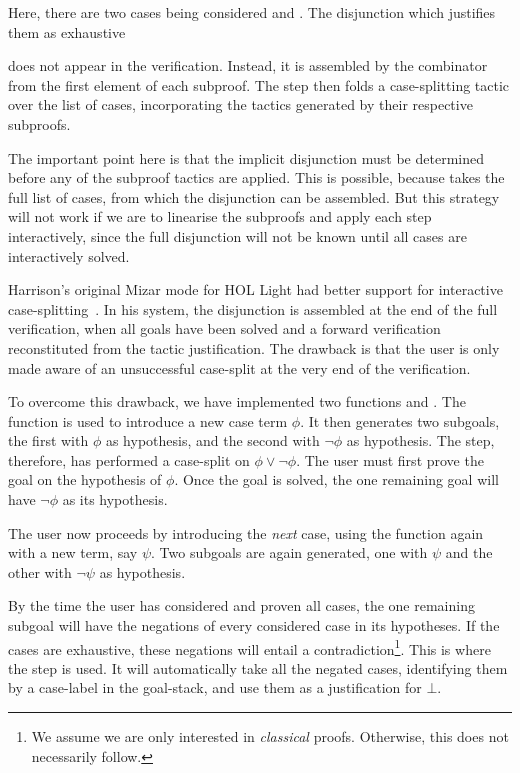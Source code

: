 {\samepage Here, there are two cases being considered  and . The disjunction which justifies them as exhaustive
\begin{center}\end{center}}

\noindent does not appear in the verification. Instead, it is assembled by the  combinator from the first element of each subproof. The step then folds a case-splitting tactic over the list of cases, incorporating the tactics generated by their respective subproofs.

The important point here is that the implicit disjunction must be determined before any of the subproof tactics are applied. This is possible, because  takes the full list of cases, from which the disjunction can be assembled. But this strategy will not work if we are to linearise the subproofs and apply each step interactively, since the full disjunction will not be known until all cases are interactively solved.

Harrison's original Mizar mode for HOL Light had better support for interactive case-splitting~\cite{MizarHOL}. In his system, the disjunction is assembled at the end of the full verification, when all goals have been solved and a forward verification reconstituted from the tactic justification. The drawback is that the user is only made aware of an unsuccessful case-split at the very end of the verification.

To overcome this drawback, we have implemented two functions  and . The  function is used to introduce a new case term $\phi$. It then generates two subgoals, the first with $\phi$ as hypothesis, and the second with $\neg\phi$ as hypothesis. The  step, therefore, has performed a case-split on $\phi\vee\neg\phi$. The user must first prove the goal on the hypothesis of $\phi$. Once the goal is solved, the one remaining goal will have $\neg\phi$ as its hypothesis.

The user now proceeds by introducing the \emph{next} case, using the  function again with a new term, say $\psi$. Two subgoals are again generated, one with $\psi$ and the other with $\neg\psi$ as hypothesis.

By the time the user has considered and proven all cases, the one remaining subgoal will have the negations of every considered case in its hypotheses. If the cases are exhaustive, these negations will entail a contradiction\footnote{We assume we are only interested in \emph{classical} proofs. Otherwise, this does not necessarily follow.}. This is where the  step is used. It will automatically take all the negated cases, identifying them by a case-label  in the goal-stack, and use them as a justification for $\bot$.

